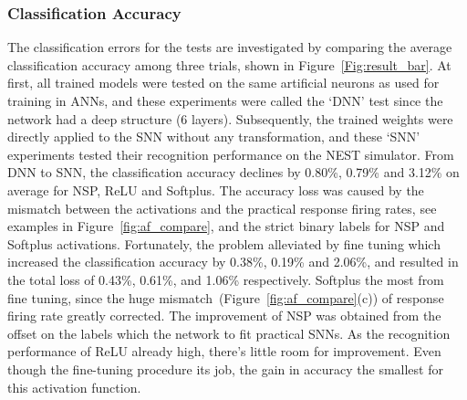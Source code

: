 	\subsubsection{Classification Accuracy}
	The classification errors for the tests are investigated by comparing the average classification accuracy among three trials, shown in Figure~\ref{Fig:result_bar}.
	At first, all trained models were tested on the same artificial neurons as used for training in ANNs, and these experiments were called the `DNN' test since the network had a deep structure (6 layers).
	Subsequently, the trained weights were directly applied to the SNN without any transformation, and these `SNN' experiments tested their recognition performance on the NEST simulator.
	From DNN to SNN, the classification accuracy declines by 0.80\%, 0.79\% and 3.12\% on average for NSP, ReLU and Softplus.
	The accuracy loss was caused by the mismatch between the activations and the practical response firing rates, see examples in Figure~\ref{fig:af_compare}, and the strict binary labels for NSP and Softplus activations.
	Fortunately, the problem \DIFdelbegin {}\DIFdelend \DIFaddbegin {}\DIFaddend alleviated by fine tuning which increased the classification accuracy by 0.38\%, 0.19\% and 2.06\%, and resulted in the total loss of 0.43\%, 0.61\%, and 1.06\% respectively.
	Softplus \DIFdelbegin {}\DIFdelend \DIFaddbegin {}\DIFaddend the most from fine tuning, since the huge mismatch~(Figure~\ref{fig:af_compare}(c)) of response firing rate \DIFdelbegin {}\DIFdelend \DIFaddbegin {}\DIFaddend greatly corrected.
	The improvement of NSP was obtained from the offset on the labels which \DIFdelbegin {}\DIFdelend \DIFaddbegin {}\DIFaddend the network to fit practical SNNs.
	As the recognition performance of ReLU \DIFdelbegin {}\DIFdelend \DIFaddbegin {}\DIFaddend already high, there's little room for improvement.
	Even though the fine-tuning procedure \DIFdelbegin {}\DIFdelend \DIFaddbegin {}\DIFaddend its job, the gain in accuracy \DIFdelbegin {}\DIFdelend \DIFaddbegin {}\DIFaddend the smallest for this activation function.


